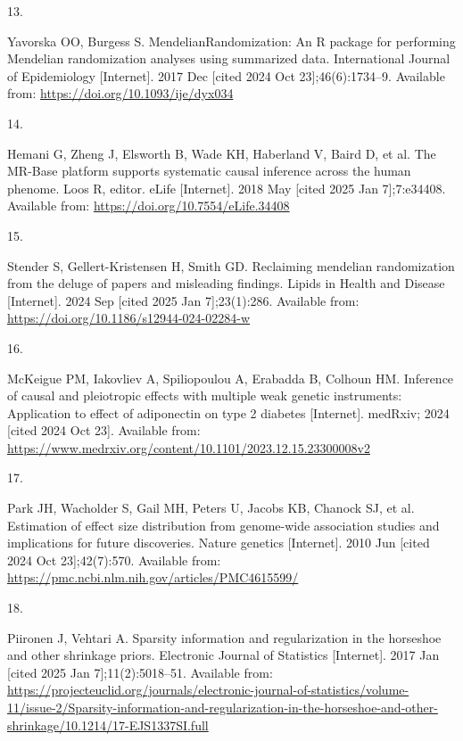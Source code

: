 \documentclass[
]{article}
\newlength{\cslhangindent}
\newlength{\csllabelwidth}
\newenvironment{CSLReferences}[2] %
 {\begin{list}{}{%
  \setlength{\itemindent}{0pt}
  \setlength{\leftmargin}{0pt}
  \setlength{\parsep}{0pt}
  \ifodd #1
   \setlength{\leftmargin}{\cslhangindent}
   \setlength{\itemindent}{-1\cslhangindent}
  \fi
  \setlength{\itemsep}{#2\baselineskip}}}
 {\end{list}}
\newcommand{\CSLLeftMargin}[1]{\parbox[t]{\csllabelwidth}{\strut#1\strut}}
\newcommand{\CSLRightInline}[1]{\parbox[t]{\linewidth - \csllabelwidth}{\strut#1\strut}}
\begin{document}
\begin{CSLReferences}{0}{1}
\CSLLeftMargin{13. }%
\CSLRightInline{Yavorska OO, Burgess S. {MendelianRandomization}: An {R} package for performing {Mendelian} randomization analyses using summarized data. International Journal of Epidemiology {[}Internet{]}. 2017 Dec {[}cited 2024 Oct 23{]};46(6):1734--9. Available from: \url{https://doi.org/10.1093/ije/dyx034}}

\CSLLeftMargin{14. }%
\CSLRightInline{Hemani G, Zheng J, Elsworth B, Wade KH, Haberland V, Baird D, et al. The {MR}-{Base} platform supports systematic causal inference across the human phenome. Loos R, editor. eLife {[}Internet{]}. 2018 May {[}cited 2025 Jan 7{]};7:e34408. Available from: \url{https://doi.org/10.7554/eLife.34408}}

\CSLLeftMargin{15. }%
\CSLRightInline{Stender S, Gellert-Kristensen H, Smith GD. Reclaiming mendelian randomization from the deluge of papers and misleading findings. Lipids in Health and Disease {[}Internet{]}. 2024 Sep {[}cited 2025 Jan 7{]};23(1):286. Available from: \url{https://doi.org/10.1186/s12944-024-02284-w}}

\CSLLeftMargin{16. }%
\CSLRightInline{McKeigue PM, Iakovliev A, Spiliopoulou A, Erabadda B, Colhoun HM. Inference of causal and pleiotropic effects with multiple weak genetic instruments: Application to effect of adiponectin on type 2 diabetes {[}Internet{]}. medRxiv; 2024 {[}cited 2024 Oct 23{]}. Available from: \url{https://www.medrxiv.org/content/10.1101/2023.12.15.23300008v2}}

\CSLLeftMargin{17. }%
\CSLRightInline{Park JH, Wacholder S, Gail MH, Peters U, Jacobs KB, Chanock SJ, et al. Estimation of effect size distribution from genome-wide association studies and implications for future discoveries. Nature genetics {[}Internet{]}. 2010 Jun {[}cited 2024 Oct 23{]};42(7):570. Available from: \url{https://pmc.ncbi.nlm.nih.gov/articles/PMC4615599/}}

\CSLLeftMargin{18. }%
\CSLRightInline{Piironen J, Vehtari A. Sparsity information and regularization in the horseshoe and other shrinkage priors. Electronic Journal of Statistics {[}Internet{]}. 2017 Jan {[}cited 2025 Jan 7{]};11(2):5018--51. Available from: \url{https://projecteuclid.org/journals/electronic-journal-of-statistics/volume-11/issue-2/Sparsity-information-and-regularization-in-the-horseshoe-and-other-shrinkage/10.1214/17-EJS1337SI.full}}


\end{CSLReferences}
\end{document}
